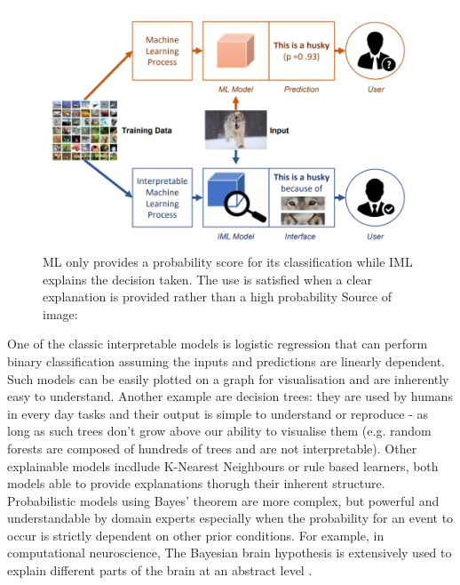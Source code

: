 \documentclass[proposal]{softeng}
\begin{document}
\begin{figure}[h!]
\centering
  \includegraphics[width=.8\textwidth]{images/iml.png}
  \caption{ML only provides a probability score for its classification while IML explains the decision taken. The use is satisfied when a clear explanation is provided rather than a high probability Source of image:\cite{YangFan2019EEWG}}
  \label{fig:iml}
\end{figure}

One of the classic interpretable models is logistic regression that can perform binary classification assuming the inputs and predictions are linearly dependent. Such models can be easily plotted on a graph for visualisation and are inherently easy to understand. Another example are decision trees: they are used by humans in every day tasks and their output is simple to understand or reproduce - as long as such trees don't grow above our ability to visualise them (e.g. random forests are composed of hundreds of trees and are not interpretable). Other explainable models incdlude K-Nearest Neighbours or rule based learners, both models able to provide explanations thorugh their inherent structure. Probabilistic models using Bayes' theorem are more complex, but powerful and understandable by domain experts especially when the probability for an event to occur is strictly dependent on other prior conditions. For example, in computational neuroscience, The Bayesian brain hypothesis is extensively used to explain different parts of the brain at an abstract level \cite{YairWeiss2002Miao}.
\end{document}
